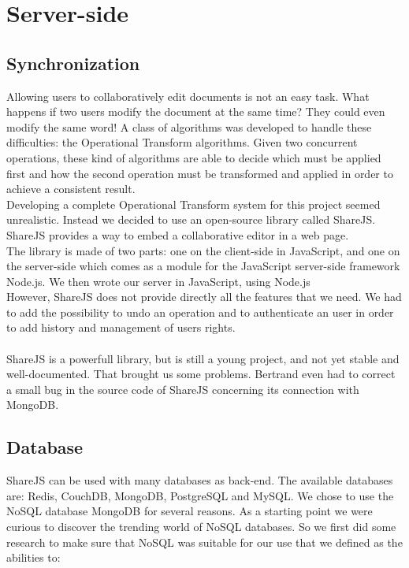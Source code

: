 \documentclass{llncs}
\begin{document}
\section{Server-side}\label{sec:Server-side}

\subsection{Synchronization}

Allowing users to collaboratively edit documents is not an easy task.
What happens if two users modify the document at the same time?
They could even modify the same word! A class of algorithms was developed to handle these difficulties:
the Operational Transform algorithms. Given two concurrent operations, these kind
of algorithms are able to decide which must be applied first and how the second
operation must be transformed and applied in order to achieve a consistent result.\\
Developing a complete Operational Transform system for this project seemed unrealistic.
Instead we decided to use an open-source library called ShareJS.\cite{sharejs}
ShareJS provides a way to embed a collaborative editor in a web page.\\
The library is made of two parts: one on the client-side in JavaScript, 
and one on the server-side which comes as a module for the JavaScript server-side framework
Node.js.\cite{nodejs} We then wrote our server in JavaScript, using Node.js\\
However, ShareJS does not provide directly all the features that we need. 
We had to add the possibility to undo an operation and to authenticate an user in order to add
history and management of users rights.\\
\\
ShareJS is a powerfull library, but is still a young project, and not yet stable and well-documented.
That brought us some problems.
Bertrand even had to correct a small bug in the source code of ShareJS concerning its connection with MongoDB.

\subsection{Database}
ShareJS can be used with many databases as back-end. 
The available databases are: Redis, CouchDB, MongoDB, PostgreSQL and MySQL.
We chose to use the NoSQL database MongoDB\cite{mongo} for several reasons. As a starting
point we were curious to discover the trending world of NoSQL databases. So we
first did some research to make sure that NoSQL was suitable for our use that we
defined as the abilities to:
\end{document}
